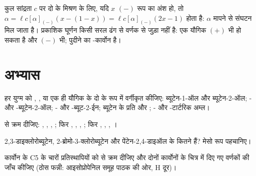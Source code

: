 कुल सांद्रता $c$ पर दो  के मिश्रण के लिए, यदि $x$
$(-)$ रूप का अंश हो, तो $\alpha = \ell c[\alpha]_{(-)}(x - (1 - x)) =
\ell c[\alpha]_{(-)}(2x - 1)$ होता है: $\alpha$ मापने से संघटन मिल जाता है।
प्रकाशिक घूर्णन किसी सरल ढंग से वर्णक से जुड़ा नहीं है: एक
 यौगिक $(+)$ भी हो सकता है और $(-)$ भी; पुदीने का -कार्वोन
 है।

\section{अभ्यास}

\begin{exercise}[$\star$]\label{exo:b1:stereochemistry-in-depth:1}
हर युग्म को , , 
या एक ही यौगिक के दो  के रूप में वर्गीकृत कीजिए: ब्यूटेन-1-ऑल और ब्यूटेन-2-ऑल;
- और -ब्यूटेन-2-ऑल; - और -ब्यूट-2-ईन; ब्यूटेन के प्रति
और ; - और -टार्टरिक
अम्ल।
\end{exercise}

\begin{exercise}[$\star$]\label{exo:b1:stereochemistry-in-depth:2}
 से क्रम दीजिए: , , , ; फिर
, , , ; फिर ,
, , ।
\end{exercise}

\begin{exercise}[$\star$]\label{exo:b1:stereochemistry-in-depth:3}
2,3-डाइक्लोरोब्यूटेन, 2-ब्रोमो-3-क्लोरोब्यूटेन
और पेंटेन-2,4-डाइऑल के कितने  हैं? मेसो रूप पहचानिए।
\end{exercise}

\begin{exercise}[$\star$]\label{exo:b1:stereochemistry-in-depth:4}
कार्वोन के C5 के चारों प्रतिस्थापियों को  से क्रम दीजिए और दोनों
कार्वोनों के चित्र में दिए गए वर्णकों की जाँच कीजिए (ठोस फन्नी:
आइसोप्रोपेनिल समूह पाठक की ओर, H दूर)।
\end{exercise}

